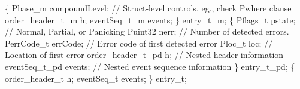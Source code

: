 \begin{tightcode}
  \{
  Pbase\_m compoundLevel;   // Struct-level controls, eg., check Pwhere clause
  order\_header\_t\_m h;
  eventSeq\_t\_m events;
\} entry\_t\_m;
\mbox{}
  \{
  Pflags\_t pstate;         // Normal, Partial, or Panicking 
  Puint32 nerr;            // Number of detected errors.
  PerrCode\_t errCode;      // Error code of first detected error
  Ploc\_t loc;              // Location of first error
  order\_header\_t\_pd h;     // Nested header information
  eventSeq\_t\_pd events;    // Nested event sequence information
\} entry\_t\_pd;
\mbox{}
  \{
  order\_header\_t h;
  eventSeq\_t events;
\} entry\_t;
\end{tightcode}
